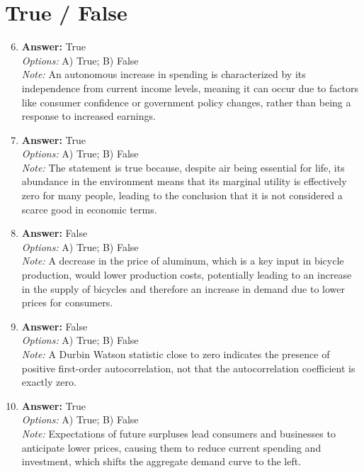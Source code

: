 \documentclass[12pt]{article}
\begin{document}
\section*{True / False}
\begin{enumerate}[label=\arabic*.]
\setcounter{enumi}{5}
\item \textbf{Answer:} True
\\ \textit{Options:} A) True; B) False
\\ \textit{Note:} An autonomous increase in spending is characterized by its independence from current income levels, meaning it can occur due to factors like consumer confidence or government policy changes, rather than being a response to increased earnings.
\item \textbf{Answer:} True
\\ \textit{Options:} A) True; B) False
\\ \textit{Note:} The statement is true because, despite air being essential for life, its abundance in the environment means that its marginal utility is effectively zero for many people, leading to the conclusion that it is not considered a scarce good in economic terms.
\item \textbf{Answer:} False
\\ \textit{Options:} A) True; B) False
\\ \textit{Note:} A decrease in the price of aluminum, which is a key input in bicycle production, would lower production costs, potentially leading to an increase in the supply of bicycles and therefore an increase in demand due to lower prices for consumers.
\item \textbf{Answer:} False
\\ \textit{Options:} A) True; B) False
\\ \textit{Note:} A Durbin Watson statistic close to zero indicates the presence of positive first-order autocorrelation, not that the autocorrelation coefficient is exactly zero.
\item \textbf{Answer:} True
\\ \textit{Options:} A) True; B) False
\\ \textit{Note:} Expectations of future surpluses lead consumers and businesses to anticipate lower prices, causing them to reduce current spending and investment, which shifts the aggregate demand curve to the left.
\end{enumerate}
\end{document}
